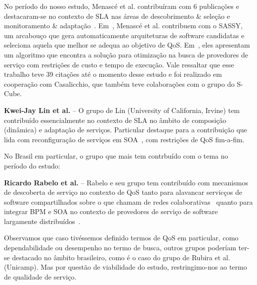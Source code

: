 No per\'{i}odo do nosso estudo, Menasc\'{e} et al. contribu\'{i}ram com 6 publica\c{c}\~{o}es e destacaram-se no contexto de SLA nas \'{a}reas de descobrimento \& sele\c{c}\~{a}o e monitoramento \& adapta\c{c}\~{a}o~\cite{5696721, DBLP:MenasceCD10, 5552741}. Em~\cite{5696721}, Menasc\'{e} et al. contribuem com o SASSY, um arcabou\c{c}o que gera automaticamente arquiteturas de software candidatas e seleciona aquela que melhor se adequa ao objetivo de QoS. Em~\cite{DBLP:MenasceCD10}, eles apresentam um algoritmo que encontra a solu\c{c}\~{a}o para otimiza\c{c}\~{a}o na busca de provedores de servi\c{c}o com restri\c{c}\~{o}es de custo e tempo de execu\c{c}\~{a}o. Vale ressaltar que esse trabalho teve 39 cita\c{c}\~{o}es at\'{e} o momento desse estudo e foi realizado em coopera\c{c}\~{a}o com Casalicchio, que tamb\'{e}m teve colabora\c{c}\~{o}es com o grupo do S-Cube.  

\textbf{Kwei-Jay Lin et al.} -- O grupo de Lin (University of California, Irvine) tem contribu\'{i}do essencialmente no contexto de SLA no \^{a}mbito de composi\c{c}\~{a}o (din\^{a}mica) e adapta\c{c}\~{a}o de servi\c{c}os. Particular destaque para  a contribui\c{c}\~{a}o \cite{Lin:2009:EAS:1602932.1603224, Lin:2010:DIS:1861294.1861332, Zhai:2009:SMS:1586636.1586972} que lida com reconfigura\c{c}\~{a}o de servi\c{c}os em SOA~\cite{SOA REFERENCE}, com restri\c{c}\~{o}es de QoS fim-a-fim. 

No Brasil em particular, o grupo que mais tem contrbu\'{i}do com o tema no per\'{i}odo do estudo:

\textbf{Ricardo Rabelo et al.} --  Rabelo e seu grupo tem contribu\'{i}do com mecanismos de descoberta de servi\c{c}o no contexto de QoS tanto para alavancar servic\c{c}os de software compartilhados sobre o que chamam de redes colaborativas~\cite{conf/ifip5-5/Perin-SouzaR11} quanto para integrar BPM e SOA no contexto de provedores de servi\c{c}o de software largamente distribu\'{i}dos~\cite{Perin-Souza:2010:AMA:1909623.1909668}.

Observamos que caso tiv\'{e}ssemos definido termos de QoS em particular, como dependabilidade ou desempenho no termo de busca, outros grupos poder\'{i}am ter-se destacado no \^{a}mbito brasileiro, como \'{e} o caso do grupo de Rubira et al. (Unicamp). Mas por quest\~{a}o de viabilidade do estudo, restringimo-nos ao termo de qualidade de servi\c{c}o.